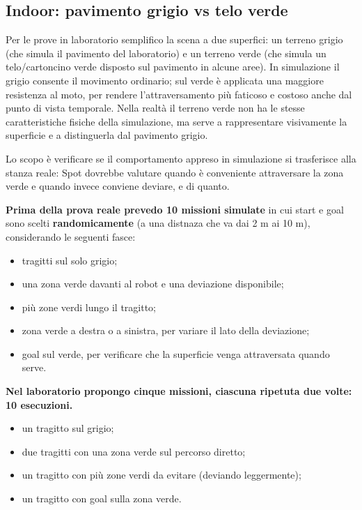 \documentclass[11pt,a4paper]{article}
\begin{document}
\subsection{Indoor: pavimento grigio vs telo verde}

Per le prove in laboratorio semplifico la scena a due superfici: un terreno grigio (che simula il pavimento del laboratorio) e un terreno verde (che simula un telo/cartoncino verde disposto sul pavimento in alcune aree).
In simulazione il grigio consente il movimento ordinario; sul verde è applicata una maggiore resistenza al moto, per rendere l'attraversamento più faticoso e costoso anche dal punto di vista temporale.
Nella realtà il terreno verde non ha le stesse caratteristiche fisiche della simulazione, ma serve a rappresentare visivamente la superficie e a distinguerla dal pavimento grigio.

Lo scopo è verificare se il comportamento appreso in simulazione si trasferisce alla stanza reale: Spot dovrebbe valutare quando è conveniente attraversare la zona verde e quando invece conviene deviare, e di quanto.

\textbf{Prima della prova reale prevedo 10 missioni simulate} in cui start e goal sono scelti \textbf{randomicamente} (a una distnaza che va dai 2 m ai 10 m), considerando le seguenti fasce:

\begin{itemize}
\item tragitti sul solo grigio;
\item una zona verde davanti al robot e una deviazione disponibile;
\item più zone verdi lungo il tragitto;
\item zona verde a destra o a sinistra, per variare il lato della deviazione;
\item goal sul verde, per verificare che la superficie venga attraversata quando serve.
\end{itemize}


\textbf{Nel laboratorio propongo cinque missioni, ciascuna ripetuta due volte: 10 esecuzioni.}
\begin{itemize}
\item un tragitto sul grigio;
\item due tragitti con una zona verde sul percorso diretto;
\item un tragitto con più zone verdi da evitare (deviando leggermente);
\item un tragitto con goal sulla zona verde.
\end{itemize}
\end{document}
